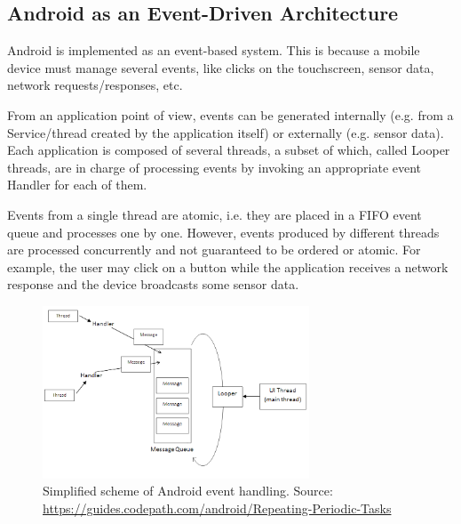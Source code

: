 \documentclass[11pt,a4paper,notitlepage]{article}
\begin{document}
\subsection{Android as an Event-Driven Architecture}
Android is implemented as an event-based system. This is because a mobile device must manage several events, like clicks on the touchscreen, sensor data, network requests/responses, etc.

From an application point of view, events can be generated internally (e.g. from a Service/thread created by the application itself) or externally (e.g. sensor data). Each application is composed of several threads, a subset of which, called Looper threads, are in charge of processing events by invoking an appropriate event Handler for each of them.

Events from a single thread are atomic, i.e. they are placed in a FIFO event queue and processes one by one. However, events produced by different threads are processed concurrently and not guaranteed to be ordered or atomic. For example, the user may click on a button while the application receives a network response and the device broadcasts some sensor data.

\begin{figure}
  \centering
  \includegraphics[width=300px]{Images/Android/event-driven.png}
  \caption[Android Event Handling]{Simplified scheme of Android event handling. Source: \url{https://guides.codepath.com/android/Repeating-Periodic-Tasks}}
\end{figure}
\end{document}
